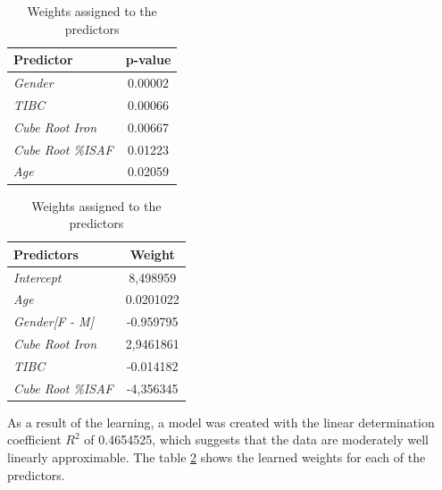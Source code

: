 \begin{table}[!ht]
	\begin{minipage}{0.48\textwidth}
		\centering
		\begin{tabular}{l|c}
			Predictor & p-value \\
			\hline
			\textit{Gender} & 0.00002 \\
			\textit{TIBC} & 0.00066 \\
			\textit{Cube Root Iron} & 0.00667 \\
			\textit{Cube Root \%ISAF} & 0.01223 \\
			\textit{Age} & 0.02059
		\end{tabular}
		\caption{Selected predictors and their p-value}
		\label{pvalue}
	\end{minipage}%
	\hspace{0.04\textwidth}
	\begin{minipage}{0.48\textwidth}
		\centering
		\begin{tabular}{l|c}
			Predictors & Weight \\
			\hline
			\textit{Intercept} & 8,498959 \\
			\textit{Age} & 0.0201022 \\
			\textit{Gender[F - M]} & -0.959795 \\
			\textit{Cube Root Iron} & 2,9461861 \\
			\textit{TIBC} & -0.014182 \\
			\textit{Cube Root \%ISAF} & -4,356345
		\end{tabular}
		\caption{Weights assigned to the predictors}
		\label{weights}		
	\end{minipage}
\end{table}

As a result of the learning, a model was created with the linear determination coefficient \textit{$R^2$} of 0.4654525, which suggests that the data are moderately well linearly approximable. The table \ref{weights} shows the learned weights for each of the predictors.
